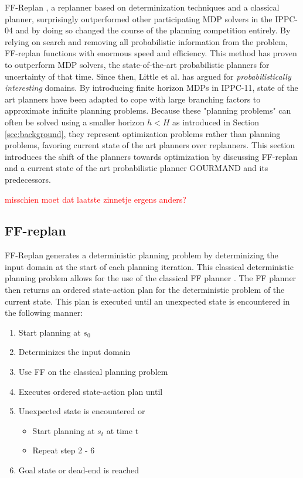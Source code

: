 \documentclass[runningheads,a4paper]{llncs}
\newcommand\myworries[1]{\textcolor{red}{#1}}
\begin{document}
FF-Replan \cite{FFReplan}, a replanner based on determinization techniques and a classical planner, surprisingly outperformed other participating MDP solvers in the IPPC-04 and by doing so changed the course of the planning competition entirely. By relying on search and removing all probabilistic information from the problem, FF-replan functions with enormous speed and efficiency. This method has proven to outperform MDP solvers, the state-of-the-art probabilistic planners for uncertainty of that time. Since then, Little et al. has argued for \emph{probabilistically interesting} domains. By introducing finite horizon MDPs in IPPC-11, state of the art planners have been adapted to cope with large branching factors to approximate infinite planning problems. Because these "planning problems" can often be solved using a smaller horizon $h < H$ as introduced in Section \ref{sec:background}, they represent optimization problems rather than planning problems, favoring current state of the art planners over replanners. This section introduces the shift of the planners towards optimization  by discussing FF-replan and a current state of the art probabilistic planner \textsc{GOURMAND} and its predecessors. 

\myworries{misschien moet dat laatste zinnetje ergens anders?}

\subsection{FF-replan}
\label{sec:ffreplan}
 FF-Replan generates a deterministic planning problem by determinizing the input domain at the start of each planning iteration. This classical deterministic planning problem allows for the use of the classical FF planner \cite{Hoffmann01theff}. The FF planner then returns an ordered state-action plan for the deterministic problem of the current state. This plan is executed until an unexpected state is encountered in the following manner:

\begin{enumerate}
	\item Start planning at $s_0$
	\item Determinizes the input domain
	\item Use FF on the classical planning problem
	\item Executes ordered state-action plan until
	\item Unexpected state is encountered or
	\begin{itemize}
		\item Start planning at $s_t$ at time t
		\item Repeat step 2 - 6
	\end{itemize}
	\item Goal state or dead-end is reached
\end{enumerate}
\end{document}
